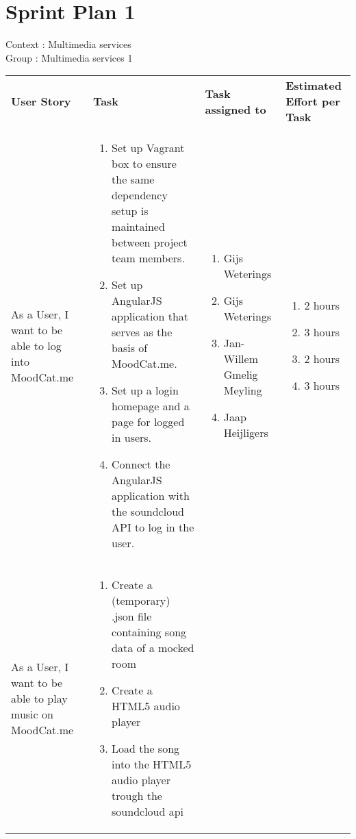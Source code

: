 \documentclass[11pt,a4paper]{article}
\begin{document}
\section*{Sprint Plan 1}
Context : Multimedia services\\
Group : Multimedia services 1\\



\begin{table}[h]
\begin{tabular}{|p{4.5cm}|p{7cm}|p{4cm}|p{2.6cm}|}
\textbf{User Story} & \textbf{Task} & \textbf{Task assigned to} & \textbf{Estimated Effort per Task} \\
As a User, I want to be able to log into MoodCat.me & \begin{enumerate}
\item Set up Vagrant box to ensure the same dependency setup is maintained between project team members.
\item Set up AngularJS application that serves as the basis of MoodCat.me.
\item Set up a login homepage and a page for logged in users.
\item Connect the AngularJS application with the soundcloud API to log in the user.
\end{enumerate}

& 
\begin{enumerate}
\item Gijs Weterings
\item Gijs Weterings
\item Jan-Willem Gmelig Meyling
\item Jaap Heijligers 
\end{enumerate}

& 
\begin{enumerate}
\item 2 hours
\item 3 hours
\item 2 hours
\item 3 hours
\end{enumerate} \\

As a User, I want to be able to play music on MoodCat.me & \begin{enumerate}
\item Create a (temporary) .json file containing song data of a mocked room
\item Create a HTML5 audio player 
\item Load the song into the HTML5 audio player trough the soundcloud api
\end{enumerate}


\end{tabular}
\end{table}
\end{document}
